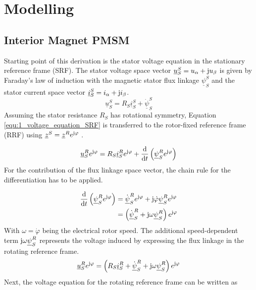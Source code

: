 \chapter{Modelling} \label{sec:modelling}


\section{Interior Magnet PMSM \label{sec:model_pmsm}}

Starting point of this derivation is the stator voltage equation in the stationary reference frame (SRF). The stator voltage space vector $\underline{u}_S^S = u_{\alpha}+\mathrm{j} u_{\beta}$ is given by Faraday's law of induction with the magnetic stator flux linkage ${\underline{\psi}}_S^S $ and the stator current space vector $\underline{i}_S^S = i_{\alpha}+\mathrm{j} i_{\beta}$.
\begin{equation}
	\underline{u}_S^S = R_S \underline{i}_S^S + \dot{\underline{\psi}}_S^S 
	\label{equ:1_voltage_equation_SRF}
\end{equation}
Assuming the stator resistance $R_S$ has rotational symmetry, Equation \eqref{equ:1_voltage_equation_SRF} is transferred to the rotor-fixed reference frame (RRF) using  $\underline{z}^{S}=\underline{z}^{R}e^{\mathrm{j}\varphi}$ .

\[
\underline{u}_S^R e^{\mathrm{j} \varphi}
=
R_S
\underline{i}_S^R e^{\mathrm{j} \varphi}
+
\frac{\mathrm{d}}{\mathrm{d} t}
\left(
\underline{\psi}_S^R e^{\mathrm{j} \varphi}
\right)
\]
For the contribution of the flux linkage space vector, the chain rule  for the differentiation has to be applied.

\begin{equation}
    \begin{split}
        \frac{\mathrm{d}}{\mathrm{d} t}
        \left(
        \underline{\psi}_S^R e^{\mathrm{j} \varphi}
        \right)
        &=
        \dot{\underline{\psi}}_S^R e^{\mathrm{j} \varphi}
        +
        \mathrm{j} \dot{\varphi}
        \underline{\psi}_S^R e^{\mathrm{j} \varphi} \\
        &=
        \left(
        \dot{\underline{\psi}}_S^R
        +
        \mathrm{j} \omega\underline{\psi}_S^R
        \right)e^{\mathrm{j} \varphi}
    \end{split}
    \label{equ:1_diff_psi}
\end{equation}
With $\omega = \dot{\varphi}$ being the electrical rotor speed.  The additional speed-dependent term $\mathrm{j}\omega\underline{\psi}_S^R$ represents the voltage induced by expressing the flux linkage in the rotating reference frame. \\
\[
\underline{u}_S^R e^{\mathrm{j} \varphi}
=
\left(
R_S
\underline{i}_S^R
+
\dot{\underline{\psi}}_S^R
+
\mathrm{j} \omega\underline{\psi}_S^R
\right)e^{\mathrm{j} \varphi}
\]
Next, the voltage equation for the rotating reference frame can be written as

